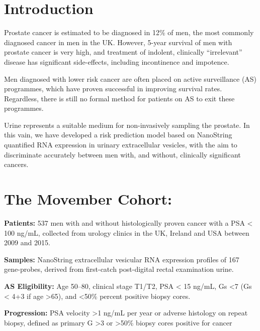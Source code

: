 \documentclass[article,30pt,extrafontsizes]{memoir}
\begin{document}
\begin{flushleft}
\begin{adjmulticols*}{2}{10mm}{10mm}
{\hypertarget{introduction}{%
\section{Introduction}\label{introduction}}

Prostate cancer is estimated to be diagnosed in 12\% of men, the most
commonly diagnosed cancer in men in the
UK\autocite{CancerResearchUK2015}. However, 5-year survival of men with
prostate cancer is very high, and treatment of indolent, clinically
``irrelevant'' disease has significant side-effects, including
incontinence and impotence.

Men diagnosed with lower risk cancer are often placed on active
surveillance (AS) programmes, which have proven successful in improving
survival rates. Regardless, there is still no formal method for patients
on AS to exit these programmes.

Urine represents a suitable medium for non-invasively sampling the
prostate\autocites{McKiernan2016b}{Tomlins2016a}{Donovan2015}. In this
vain, we have developed a risk prediction model based on NanoString
quantified RNA expression in urinary extracellular vesicles, with the
aim to discriminate accurately between men with, and without, clinically
significant cancers. \vspace{-30mm}

\hypertarget{the-movember-cohort}{%
\section{The Movember Cohort:}\label{the-movember-cohort}}

\textbf{Patients:} 537 men with and without histologically proven cancer
with a PSA \textless{} 100 ng/mL, collected from urology clinics in the
UK, Ireland and USA between 2009 and 2015.

\textbf{Samples:} NanoString extracellular vesicular RNA expression
profiles of 167 gene-probes, derived from first-catch post-digital
rectal examination urine.

\textbf{AS Eligibility:} Age 50--80, clinical stage T1/T2, PSA
\textless{} 15 ng/mL, Gs \textless{}7 (Gs \textless{} 4+3 if age
\textgreater{}65), and \textless{}50\% percent positive biopsy cores.

\textbf{Progression:} PSA velocity \textgreater{}1 ng/mL per year or
adverse histology on repeat biopsy, defined as primary G \textgreater{}3
or \textgreater{}50\% biopsy cores positive for cancer

}
\end{adjmulticols*}
\end{flushleft}
\end{document}
